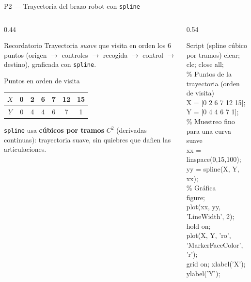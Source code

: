 \documentclass[aspectratio=169,10pt]{beamer}
\begin{document}
\begin{frame}{P2 — Trayectoria del brazo robot con \texttt{spline}}
\begin{columns}[T]
\begin{column}{0.44\textwidth}
\begin{cardidea}{Recordatorio}{\faQuestionCircle}
{\footnotesize Trayectoria \emph{suave} que visita en orden los 6 puntos (origen $\to$ controles $\to$ recogida $\to$ control $\to$ destino), graficada con \texttt{spline}.}
\end{cardidea}
\vspace{1mm}
\begin{cardgear}{Puntos en orden de visita}{\faTable}
\centering
{\footnotesize\renewcommand{\arraystretch}{1.25}\setlength{\tabcolsep}{5pt}
\begin{tabular}{c|cccccc}
$X$ & 0 & 2 & 6 & 7 & 12 & 15\\\hline
$Y$ & 0 & 4 & 4 & 6 & 7 & 1\\
\end{tabular}}
\end{cardgear}
\vspace{1mm}
\begin{cardnota}[\faInfoCircle]
{\footnotesize \texttt{spline} usa \textbf{cúbicos por tramos} $C^2$ (derivadas continuas): trayectoria suave, sin quiebres que dañen las articulaciones.}
\end{cardnota}
\end{column}
\begin{column}{0.54\textwidth}
\begin{cardgear}{Script (spline cúbico por tramos)}{\faCode}
{\scriptsize\ttfamily
clear; clc; close all;\\[0.4mm]
\% Puntos de la trayectoria (orden de visita)\\
X = [0 2 6 7 12 15];\\
Y = [0 4 4 6 7 1];\\[0.6mm]
\% Muestreo fino para una curva suave\\
xx = linspace(0,15,100);\\
yy = spline(X, Y, xx);\\[0.6mm]
\% Gráfica\\
figure;\\
plot(xx, yy, 'LineWidth', 2); hold on;\\
plot(X, Y, 'ro', 'MarkerFaceColor', 'r');\\
grid on; xlabel('X'); ylabel('Y');
}
\end{cardgear}
\end{column}
\end{columns}
\end{frame}
\end{document}
